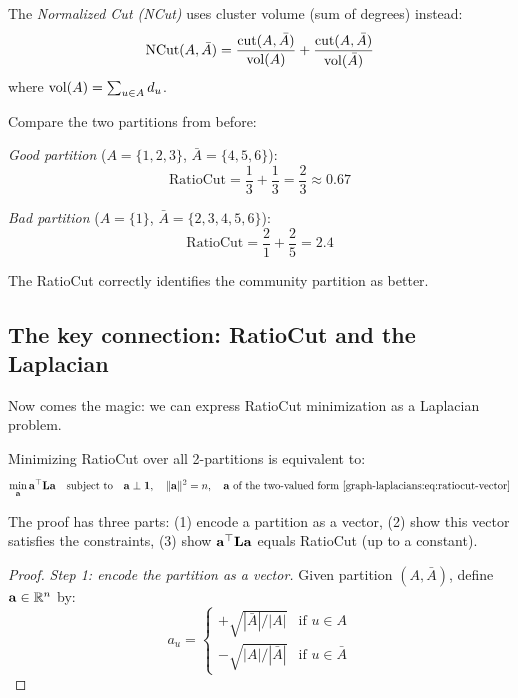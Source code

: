 \begin{notechapter}
\begin{definition}
The \emph{Normalized Cut (NCut)} uses cluster volume (sum of degrees) instead:
\begin{equation}
\text{NCut}(A, \bar{A}) = \frac{\mathrm{cut}(A, \bar{A})}{\mathrm{vol}(A)} + \frac{\mathrm{cut}(A, \bar{A})}{\mathrm{vol}(\bar{A})}
\end{equation}
where $\mathrm{vol}(A) = \sum_{u \in A} d_u$.
\end{definition}

\begin{example}
Compare the two partitions from before:

\emph{Good partition} ($A = \{1,2,3\}$, $\bar{A} = \{4,5,6\}$):
\[
\text{RatioCut} = \frac{1}{3} + \frac{1}{3} = \frac{2}{3} \approx 0.67
\]

\emph{Bad partition} ($A = \{1\}$, $\bar{A} = \{2,3,4,5,6\}$):
\[
\text{RatioCut} = \frac{2}{1} + \frac{2}{5} = 2.4
\]

The RatioCut correctly identifies the community partition as better.
\end{example}

\subsection{The key connection: RatioCut and the Laplacian}

Now comes the magic: we can express RatioCut minimization as a Laplacian problem.

\begin{theorem}\label{graph-laplacians:thm:ratiocut-relaxation}
Minimizing RatioCut over all 2-partitions is equivalent to:
\begin{equation}
\min_{\mathbf{a}} \mathbf{a}^\top \mathbf{L} \mathbf{a} \quad \text{subject to} \quad \mathbf{a} \perp \mathbf{1}, \quad \|\mathbf{a}\|^2 = n, \quad \mathbf{a} \text{ of the two-valued form \eqref{graph-laplacians:eq:ratiocut-vector}}
\end{equation}
\end{theorem}

The proof has three parts: (1) encode a partition as a vector, (2) show this vector satisfies the constraints, (3) show $\mathbf{a}^\top \mathbf{L} \mathbf{a}$ equals RatioCut (up to a constant).

\begin{proof}
\emph{Step 1: encode the partition as a vector.}
Given partition $(A, \bar{A})$, define $\mathbf{a} \in \mathbb{R}^n$ by:
\begin{equation}\label{graph-laplacians:eq:ratiocut-vector}
a_u = \begin{cases} +\sqrt{|\bar{A}|/|A|}  & \text{if } u \in A \\[4pt] -\sqrt{|A|/|\bar{A}|} & \text{if } u \in \bar{A} \end{cases}
\end{equation}


\end{proof}
\end{notechapter}
